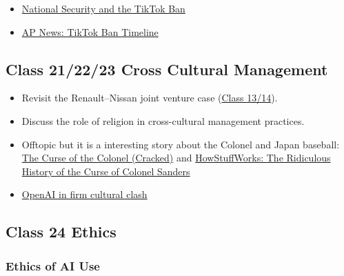 \documentclass[
  11pt,
]{article}
\providecommand{\tightlist}{%
  \setlength{\itemsep}{0pt}\setlength{\parskip}{0pt}}
\begin{document}
\begin{itemize}
\tightlist
\item
  \href{https://www.american.edu/sis/news/20250123-national-security-and-the-tik-tok-ban.cfm}{National
  Security and the TikTok Ban}
\item
  \href{https://apnews.com/article/tiktok-ban-biden-timeline-india-119969bfc584e92d47baa189a3e1c4fc}{AP
  News: TikTok Ban Timeline}
\end{itemize}

\subsection{Class 21/22/23 Cross Cultural
Management}\label{class-212223-cross-cultural-management}

\begin{itemize}
\tightlist
\item
  Revisit the Renault--Nissan joint venture case
  (\hyperref[class13-14]{Class 13/14}).
\item
  Discuss the role of religion in cross-cultural management practices.
\item
  Offtopic but it is a interesting story about the Colonel and Japan
  baseball:
  \href{https://www.cracked.com/article_44709_the-japanese-baseball-team-cursed-by-colonel-sanders.html}{The
  Curse of the Colonel (Cracked)} and
  \href{https://history.howstuffworks.com/american-history/ridiculous-history-curse-colonel.htm}{HowStuffWorks:
  The Ridiculous History of the Curse of Colonel Sanders}
\item
  \href{https://archive.ph/rR3Gt\#selection-565.3-593.46}{OpenAI in firm
  cultural clash}
\end{itemize}

\subsection{Class 24 Ethics}\label{class-24-ethics}

\subsubsection{Ethics of AI Use}\label{ethics-of-ai-use}
\end{document}
